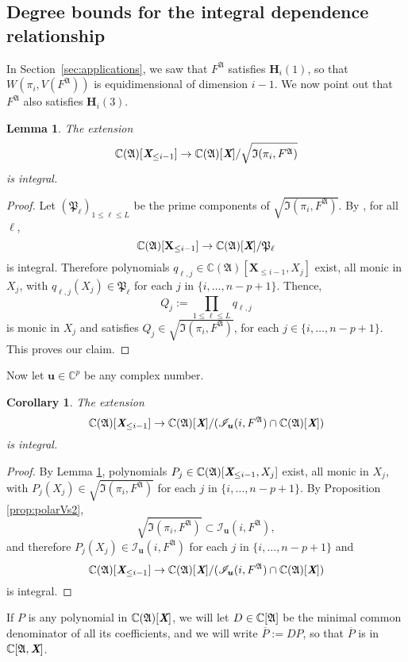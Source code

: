 \documentclass[a4paper]{article}
\def\fp{\mathfrak{P}}
\def\A{\mathfrak{A}}
\def\Xb{\textit{\textbf{X}}}
\def\ub{{\bm u}}
\def\C{\mathbb{C}}
\def\WifA{W(\pi_i,V(F^{\A}))}
\def\IifAr{\sqrt{\mathfrak{I}(\pi_i,F^{\A})}}
\def\IifA{\mathfrak{I}(\pi_i,F^{\A})}
\def\IilfA{\mathscr{I}_{\ub}(i,F^{\A})}
\newtheorem{corollary}[theorem]{Corollary}
\newtheorem{lemma}[theorem]{Lemma}
\begin{document}
\subsection{Degree bounds for the integral dependence relationship} 
%
In Section~\ref{sec:applications}, we saw that
$F^\A$ satisfies $\bm H_i(1)$, so that $\WifA$ is equidimensional of dimension $i-1$. We
now point out that $F^\A$ also satisfies $\bm H_i(3)$.
\begin{lemma}\label{lem:6.1}
 The extension $$\C(\A)[\Xb_{\leq i-1}]\rightarrow
 \C(\A)[\Xb]/\IifAr$$ is integral.
\end{lemma}
%
\begin{proof}
  Let $(\fp_\ell)_{1 \le \ell \leq L}$ be the prime components of $\IifAr$. By \cite[Proposition 1]{EMP}, for all
  $\ell$,
  \[
    \C(\A)[\textbf{X}_{\leq i-1}]\rightarrow\C(\A)[\Xb]/\fp_\ell
  \] 
  is integral. Therefore polynomials
  $q_{\ell,j}\in\C(\A)[\textbf{X}_{\leq i-1},X_j]$ exist, all monic in
  $X_j$, with $q_{\ell,j}(X_j)\in \fp_\ell$ for each $j$ in
  $\{i,\hdots,n-p+1\}.$ Thence, \[Q_{j} := \prod_{1 \le \ell\le L}
  q_{\ell,j}\] is monic in $X_j$ and satisfies $ Q_{j} \in \sqrt{\IifA}$, for
  each $j \in \{i,\hdots,n-p+1\}.$ This proves our claim.
\end{proof}
%
\noindent 
Now let $\ub \in \C^p$ be any complex number. 
\begin{corollary}\label{lem:6.2}
 The extension $$\C(\A)[\Xb_{\leq i-1}]\rightarrow
 \C(\A)[\Xb]/(\IilfA \cap \C(\A)[\Xb])$$ is integral.
\end{corollary}
%
\begin{proof}
By Lemma \ref{lem:6.1}, polynomials
  $P_{j}\in\C(\A)[\Xb_{\leq i-1},X_j]$ exist, all monic in
  $X_j$, with $P_{j}(X_j)\in \IifAr$ for each $j$ in
  $\{i,\hdots,n-p+1\}.$ By Proposition \ref{prop:polarVs2}, 
  \[
  \sqrt{\IifA} \subset \IilfA,
  \]
  and therefore $P_{j}(X_j)\in \IilfA$ for each $j$ in 
  $\{i,\hdots,n-p+1\}$ and 
  \[
  \C(\A)[\Xb_{\leq i-1}]\rightarrow
 \C(\A)[\Xb]/(\IilfA \cap \C(\A)[\Xb])
  \]
 is integral.
\end{proof}
%
\noindent
If $P$ is any polynomial in $\C(\frak A)[\Xb]$, we will let
$D \in \C[\frak A]$ be the minimal common denominator of all its
coefficients, and we will write $\overline P := D P$, so that
$\overline P$ is in $\C[\A,\Xb]$.
\end{document}

